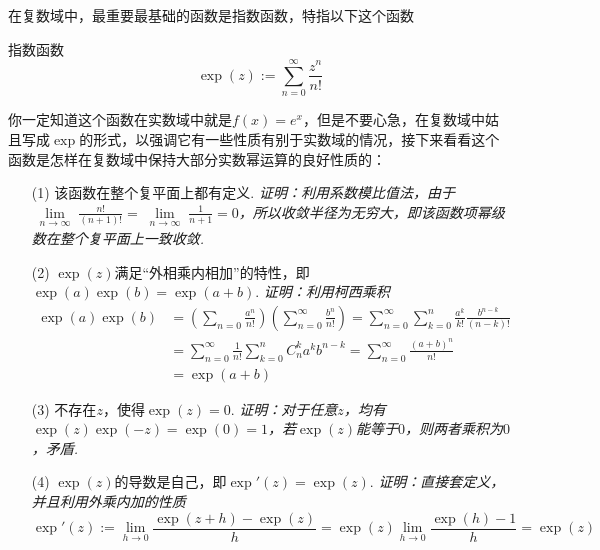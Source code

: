 \documentclass[main.tex]{subfiles}
\begin{document}
在复数域中，最重要最基础的函数是指数函数，特指以下这个函数
\begin{definition}{指数函数}
    \[\exp(z) := \sum_{n=0}^{\infty}\frac{z^n}{n!}\]
\end{definition}
你一定知道这个函数在实数域中就是\(f(x)=e^x\)，但是不要心急，在复数域中姑且写成\(\exp\)的形式，以强调它有一些性质有别于实数域的情况，接下来看看这个函数是怎样在复数域中保持大部分实数幂运算的良好性质的：
\begin{itemize}
    \item [(1)] 该函数在整个复平面上都有定义. 
    \newline
    \textit{
        证明：利用系数模比值法，由于\(\displaystyle{\lim \limits_{\substack{n \to \infty}} \frac{n!}{(n+1)!} = \lim \limits_{\substack{n \to \infty}} \frac{1}{n+1} = 0}\)，所以收敛半径为无穷大，即该函数项幂级数在整个复平面上一致收敛.
    }
    \item [(2)] \(\exp(z)\)满足“外相乘内相加”的特性，即\(\exp(a)\exp(b)=\exp(a+b)\).
    \newline
    \textit{
        证明：利用柯西乘积
    }
    \begin{align*}
        \exp(a)\exp(b) &= \left(\sum_{n=0}\frac{a^n}{n!}\right)\left(\sum_{n=0}^{\infty}\frac{b^n}{n!}\right) = \sum_{n=0}^{\infty}\sum_{k=0}^{n}\frac{a^k}{k!}\frac{b^{n-k}}{(n-k)!} \\
        &= \sum_{n=0}^{\infty}\frac{1}{n!}\sum_{k=0}^{n}C_n^ka^kb^{n-k} = \sum_{n=0}^{\infty}\frac{(a+b)^n}{n!} \\
        &= \exp(a+b)
    \end{align*}

    \item [(3)] 不存在\(z\)，使得\(\exp(z)=0\).
    \newline
    \textit{
        证明：对于任意\(z\)，均有\(\exp(z)\exp(-z)=\exp(0)=1\)，若\(\exp(z)\)能等于\(0\)，则两者乘积为\(0\)，矛盾.
    }
    \item [(4)] \(\exp(z)\)的导数是自己，即\(\exp'(z)=\exp(z)\).
    \newline
    \textit{
        证明：直接套定义，并且利用外乘内加的性质
        \[\exp'(z) := \lim_{h \to 0}\frac{\exp(z+h)-\exp(z)}{h} = \exp(z)\lim_{h \to 0}\frac{\exp(h)-1}{h} = \exp(z)\]
    }
\end{itemize}
\end{document}
